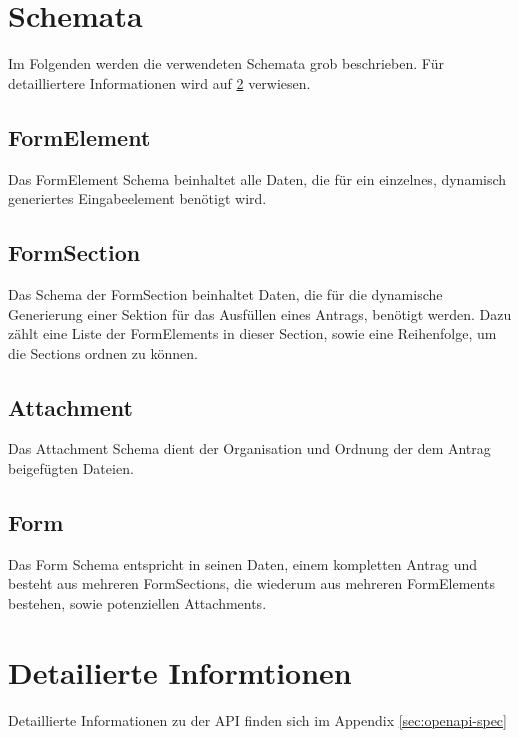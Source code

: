 \section{Schemata}
Im Folgenden werden die verwendeten Schemata grob beschrieben. Für detailliertere Informationen
wird auf \ref{sec:Detailiertere Informationen} verwiesen.

\subsection{FormElement}
Das FormElement Schema beinhaltet alle Daten, die für ein einzelnes, dynamisch generiertes
Eingabeelement benötigt wird.

\subsection{FormSection}
Das Schema der FormSection beinhaltet Daten, die für die dynamische Generierung einer Sektion
für das Ausfüllen eines Antrags, benötigt werden. Dazu zählt eine Liste der FormElements in
dieser Section, sowie eine Reihenfolge, um die Sections ordnen zu können.

\subsection{Attachment}
Das Attachment Schema dient der Organisation und Ordnung der dem Antrag beigefügten Dateien.

\subsection{Form}
Das Form Schema entspricht in seinen Daten, einem kompletten Antrag und besteht aus mehreren
FormSections, die wiederum aus mehreren FormElements bestehen, sowie potenziellen Attachments.

\section{Detailierte Informtionen}\label{sec:Detailiertere Informationen}
Detaillierte Informationen zu der \ac{API} finden sich im Appendix \ref{sec:openapi-spec}